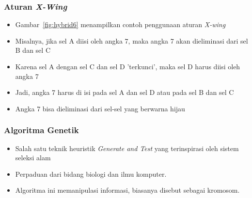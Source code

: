\documentclass{beamer}
\begin{document}
\note{

}

\begin{frame}
\frametitle{Aturan \textit{X-Wing}}
\begin{itemize}
\item Gambar~\ref{fig:hybrid6} menampilkan contoh penggunaan aturan \textit{X-wing}
\item Misalnya, jika sel A diisi oleh angka 7, maka angka 7 akan dieliminasi dari sel B dan sel C
\item Karena sel A dengan sel C dan sel D 'terkunci', maka sel D harus diisi oleh angka 7
\item Jadi, angka 7 harus di isi pada sel A dan sel D atau pada sel B dan sel C
\item Angka 7 bisa dieliminasi dari sel-sel yang berwarna hijau
\end{itemize}
\end{frame}


\begin{frame}
\frametitle{Algoritma Genetik}
\begin{itemize}
\item Salah satu teknik heuristik \textit{Generate and Test} yang terinspirasi oleh sistem seleksi alam
\item Perpaduan dari bidang biologi dan ilmu komputer.
\item Algoritma ini memanipulasi informasi, biasanya disebut sebagai kromosom.
\end{itemize}
\end{frame}

\end{document}

